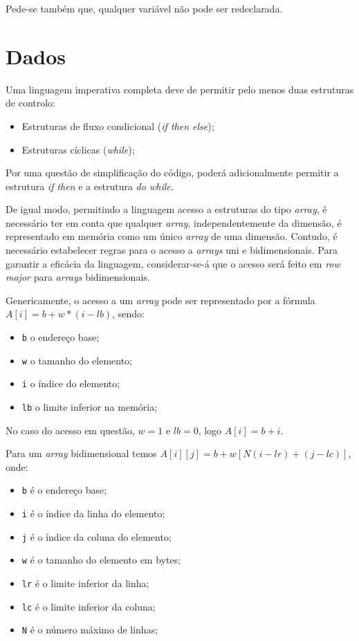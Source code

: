Pede-se também que, qualquer variável não pode ser redeclarada.

\section{Dados}
\label{sec:dados:analise}

Uma linguagem imperativa completa deve de permitir pelo menos duas estruturas de controlo:

\begin{itemize}
	\item Estruturas de fluxo condicional (\emph{if then else});
	\item Estruturas cíclicas (\emph{while});
\end{itemize}

Por uma questão de simplificação do código, poderá adicionalmente permitir
a estrutura \emph{if then} e a estrutura \emph{do while}.

De igual modo, permitindo a linguagem acesso a estruturas do tipo \emph{array},
é necessário ter em conta que qualquer \emph{array}, independentemente da dimensão,
é representado em memória como um único \emph{array} de uma dimensão. Contudo,
é necessário estabelecer regras para o acesso a \emph{\emph{array}s} uni e bidimensionais. Para
garantir a eficácia da linguagem, considerar-se-á que o acesso será feito em
\emph{row major} para \emph{\emph{array}s} bidimensionais.

Genericamente, o acesso a um \emph{array} pode ser representado por a fórmula $A[i]
= b + w * (i - lb)$, sendo:

\begin{itemize}
	\item \texttt{b} o endereço base;
\item \texttt{w} o tamanho do elemento;
\item \texttt{i} o índice do elemento;
\item \texttt{lb} o limite inferior na memória;
\end{itemize}

No caso do acesso em questão, $w = 1$ e $lb = 0$, logo $A[i] = b + i$.

Para um \emph{array} bidimensional temos $A[i][j] = b + w [N(i - lr) + (j
- lc)]$, onde:

\begin{itemize}
	\item \texttt{b} é o endereço base;
\item \texttt{i} é o índice da linha do elemento;
\item \texttt{j} é o índice da coluna do elemento;
\item \texttt{w} é o tamanho do elemento em bytes;
\item \texttt{lr} é o limite inferior da linha;
\item \texttt{lc} é o limite inferior da coluna;
\item \texttt{N} é o número máximo de linhas;
\end{itemize}

